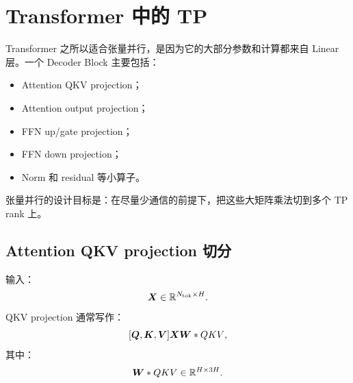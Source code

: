 \section{Transformer 中的 TP}
\label{sec:tp-in-transformer}

Transformer 之所以适合张量并行，是因为它的大部分参数和计算都来自 Linear 层。一个 Decoder Block 主要包括：

\begin{itemize}
\item Attention QKV projection；
\item Attention output projection；
\item FFN up/gate projection；
\item FFN down projection；
\item Norm 和 residual 等小算子。
\end{itemize}

张量并行的设计目标是：在尽量少通信的前提下，把这些大矩阵乘法切到多个 TP rank 上。

\subsection{Attention QKV projection 切分}
\label{subsec:tp-attention-qkv-projection}

输入：
\[
\bm{X}\in\mathbb{R}^{N_{\mathrm{tok}}\times H}.
\]
QKV projection 通常写作：
\[
[\bm{Q},\bm{K},\bm{V}]
\bm{X}\bm{W}*{QKV},
\]
其中：
\[
\bm{W}*{QKV}\in\mathbb{R}^{H\times 3H}.
\]

